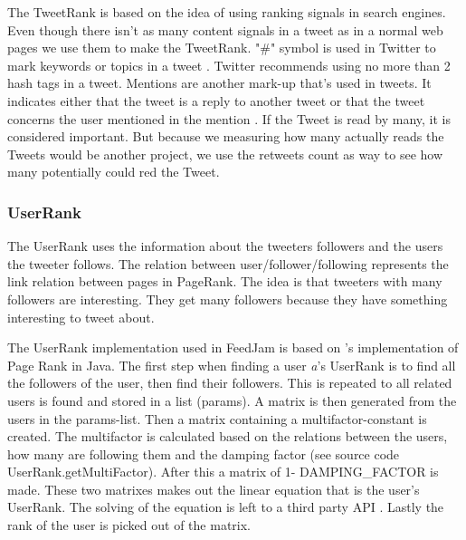 The TweetRank is based on the idea of using ranking signals in search engines. Even though there isn't as many content signals in a tweet as in a normal web pages we use them to make the TweetRank. "\#" symbol is used in Twitter to mark keywords or topics in a tweet \citep{Twitter}. Twitter recommends using no more than 2 hash tags in a tweet. 
Mentions are another mark-up that's used in tweets. It indicates either that the tweet is a reply to another tweet or that the tweet concerns the user mentioned in the mention \citep{Twitterb}.
If the Tweet is read by many, it is considered important. But because we measuring how many actually reads the Tweets would be another project, we use the retweets count as way to see how many potentially could red the Tweet.

\subsubsection{UserRank}
The UserRank uses the information about the tweeters followers and the users the tweeter follows. The relation between user/follower/following represents the link relation between pages in PageRank. The idea is that tweeters with many followers are interesting. They get many followers because they have something interesting to tweet about. 

\newline
The UserRank implementation used in FeedJam is based on \citet{Goodrarzi2009}'s implementation of Page Rank in Java. The first step when finding a user \emph{a}'s UserRank is to find all the followers of the user, then find their followers. This is repeated to all related users is found and stored in a list (params). A matrix is then generated from the users in the params-list. Then a matrix containing a multifactor-constant is created. The multifactor is calculated based on the relations between the users, how many are following them and the damping factor (see source code UserRank.getMultiFactor). After this a matrix of 1- DAMPING_FACTOR is made. These two matrixes makes out the linear equation that is the user's UserRank. The solving of the equation is left to a third party API \citep{Jama}. Lastly the rank of the user is picked out of the matrix. 


